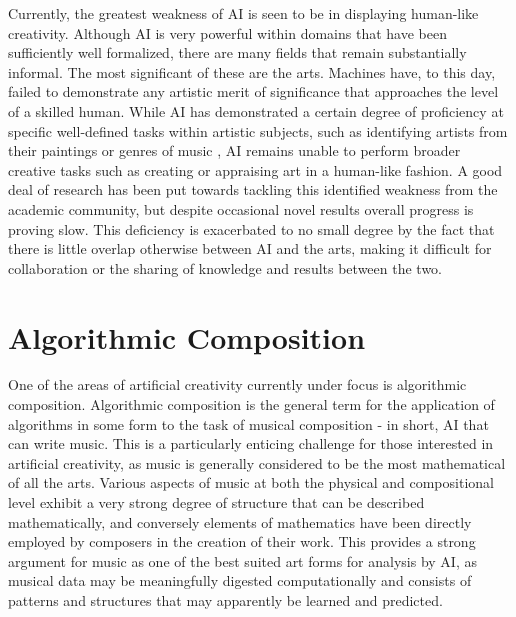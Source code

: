 \documentclass[ author={Stephen Livermore-Tozer},
				supervisor={Dr. Peter Flach},
				degree={MEng},
				title={Performing Algorithmic Co-composition Using Machine Learning},
				subtitle={},
				type={research},
				year={2016} ]{dissertation}
\begin{document}
	Currently, the greatest weakness of AI is seen to be in displaying human-like creativity. Although AI is very powerful within domains that have been sufficiently well formalized, there are many fields that remain substantially informal. The most significant of these are the arts. Machines have, to this day, failed to demonstrate any artistic merit of significance that approaches the level of a skilled human. While AI has demonstrated a certain degree of proficiency at specific well-defined tasks within artistic subjects, such as identifying artists from their paintings \cite{blessing2010using} or genres of music \cite{haggblade2011music}, AI remains unable to perform broader creative tasks such as creating or appraising art in a human-like fashion. A good deal of research has been put towards tackling this identified weakness from the academic community, but despite occasional novel results overall progress is proving slow. This deficiency is exacerbated to no small degree by the fact that there is little overlap otherwise between AI and the arts, making it difficult for collaboration or the sharing of knowledge and results between the two.
	
	
	\section{Algorithmic Composition}
	
	One of the areas of artificial creativity currently under focus is algorithmic composition. Algorithmic composition is the general term for the application of algorithms in some form to the task of musical composition - in short, AI that can write music. This is a particularly enticing challenge for those interested in artificial creativity, as music is generally considered to be the most mathematical of all the arts. Various aspects of music at both the physical and compositional level exhibit a very strong degree of structure that can be described mathematically, and conversely elements of mathematics have been directly employed by composers in the creation of their work. This provides a strong argument for music as one of the best suited art forms for analysis by AI, as musical data may be meaningfully digested computationally and consists of patterns and structures that may apparently be learned and predicted. 
	
\end{document}
